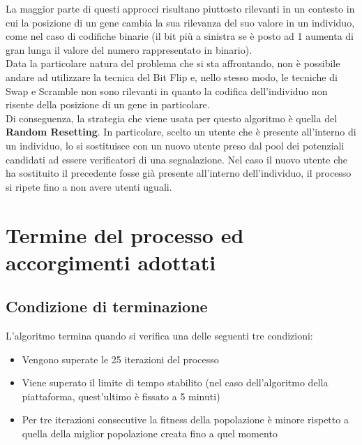         La maggior parte di questi approcci risultano piuttosto rilevanti in un contesto in cui la posizione di un gene cambia la sua rilevanza del suo valore in un individuo, come nel caso di codifiche binarie (il bit più a sinistra se è posto ad 1 aumenta di gran lunga il valore del numero rappresentato in binario). \\
        Data la particolare natura del problema che si sta affrontando, non è possibile andare ad utilizzare la tecnica del Bit Flip e, nello stesso modo, le tecniche di Swap e Scramble non sono rilevanti in quanto la codifica dell'individuo non risente della posizione di un gene in particolare. \\
        Di conseguenza, la strategia che viene usata per questo algoritmo è quella del \textbf{Random Resetting}. In particolare, scelto un utente che è presente all'interno di un individuo, lo si sostituisce con un nuovo utente preso dal pool dei potenziali candidati ad essere verificatori di una segnalazione. Nel caso il nuovo utente che ha sostituito il precedente fosse già presente all'interno dell'individuo, il processo si ripete fino a non avere utenti uguali.
\section{Termine del processo ed accorgimenti adottati}

    \subsection{Condizione di terminazione}
        L'algoritmo termina quando si verifica una delle seguenti tre condizioni:

        \begin{itemize}
            \item Vengono superate le 25 iterazioni del processo
            \item Viene superato il limite di tempo stabilito (nel caso dell'algoritmo della piattaforma, quest'ultimo è fissato a 5 minuti)
            \item Per tre iterazioni consecutive la fitness della popolazione è minore rispetto a quella della miglior popolazione creata fino a quel momento
        \end{itemize}

